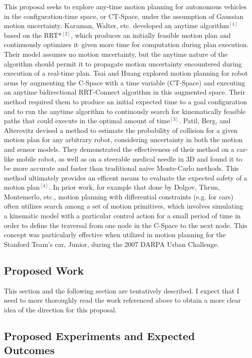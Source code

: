 \documentclass[12pt]{article}
\begin{document}
This proposal seeks to explore any-time motion planning for autonomous vehicles in the configuration-time space, or CT-Space, under the assumption of Gaussian motion uncertainty. Karaman, Walter, etc. developed an anytime algorithm$^{[1]}$ based on the RRT*$^{[2]}$, which produces an initially feasible motion plan and continuously optimizes it--given more time for computation during plan execution. Their model assumes no motion uncertainty, but the anytime nature of the algorithm should permit it to propagate motion uncertainty encountered during execution of a real-time plan. Tsai and Huang explored motion planning for robot arms by augmenting the C-Space with a time variable (CT-Space) and executing an anytime bidirectional RRT-Connect algorithm in this augmented space. Their method required them to produce an initial expected time to a goal configuration and to run the anytime algorithm to continously search for kinematically feasible paths that could execute in the optimal amount of time$^{[3]}$. Patil, Berg, and Alterovitz devised a method to estimate the probability of collision for a given motion plan for any arbitrary robot, considering uncertainty in both the motion and sensor models. They demonstrated the effectiveness of their method on a car-like mobile robot, as well as on a steerable medical needle in 3D and found it to be more accurate and faster than traditional naive Monte-Carlo methods. This method ultimately provides an efficent means to evaluate the expected safety of a motion plan$^{[4]}$. In prior work, for example that done by Dolgov, Thrun, Montemerlo, etc., motion planning with differential constraints (e.g. for cars) often utilizes search among a set of motion primitives, which involves simulating a kinematic model with a particular control action for a small period of time in order to define the traversal from one node in the C-Space to the next node. This concept was particularly effective when utilized in motion planning for the Stanford Team's car, Junior, during the 2007 DARPA Urban Challenge.

\subsection*{Proposed Work}
This section and the following section are tentatively described. I expect that I need to more thoroughly read the work referenced above to obtain a more clear idea of the direction for this proposal.

\subsection*{Proposed Experiments and Expected Outcomes}
\end{document}
